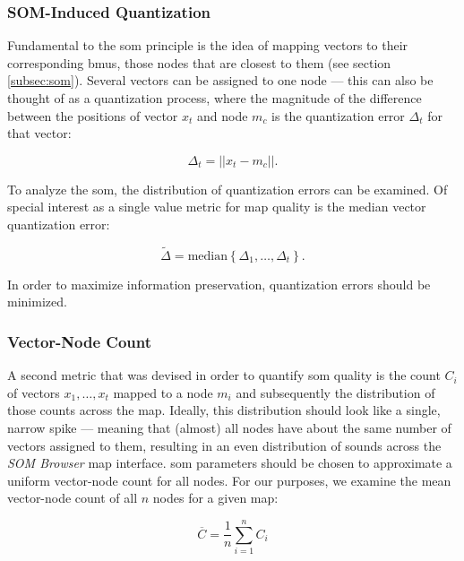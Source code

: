 \subsubsection{SOM-Induced Quantization}
\label{subsubsec:som_quantization}
Fundamental to the \gls{som} principle is the idea of mapping vectors to their
corresponding \glspl{bmu}, those nodes that are closest to them (see section
\ref{subsec:som}). Several vectors can be assigned to one node --- this can also
be thought of as a quantization process, where the magnitude of the difference
between the positions of vector $ x_t $ and node $ m_c $ is the quantization
error $ \Delta_t $ for that vector:

\begin{equation}
  \Delta_t = || x_t - m_c ||.
\end{equation}

To analyze the \gls{som}, the distribution of quantization errors can be
examined. Of special interest as a single value metric for map quality is the
median vector quantization error:

\begin{equation}
  \widetilde{\Delta} = \text{median} \left \{
  \Delta_1, \dots , \Delta_t \right \}.
\end{equation}

In order to maximize information preservation, quantization errors should be
minimized.

\subsubsection{Vector-Node Count}
\label{subsubsec:vector_node_count}
A second metric that was devised in order to quantify \gls{som} quality is the
count $ C_i $ of vectors $ x_1, \dots , x_t $ mapped to a node $ m_i $ and
subsequently the distribution of those counts across the map. Ideally, this
distribution should look like a single, narrow spike --- meaning that (almost)
all nodes have about the same number of vectors assigned to them, resulting in
an even distribution of sounds across the \textit{SOM Browser} map interface.
\gls{som} parameters should be chosen to approximate a uniform vector-node count
for all nodes. For our purposes, we examine the mean vector-node count of all
$n$ nodes for a given map:

\begin{equation}
  \overline{C} = \frac{1}{n} \sum\limits_{i=1}^{n}{C_i}
\end{equation}

